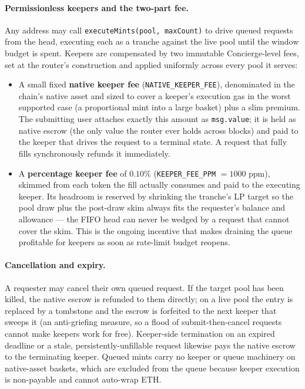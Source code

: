 \documentclass[11pt]{article}
\begin{document}
\paragraph{Permissionless keepers and the two-part fee.} Any address may
call \texttt{executeMints(pool, maxCount)} to drive queued requests from
the head, executing each as a tranche against the live pool until the
window budget is spent. Keepers are compensated by two immutable
Concierge-level fees, set at the router's construction and applied
uniformly across every pool it serves:
\begin{itemize}
  \item A small fixed \textbf{native keeper fee}
        (\texttt{NATIVE\_KEEPER\_FEE}), denominated in the chain's native
        asset and sized to cover a keeper's execution gas in the
        worst supported case (a proportional mint into a large basket)
        plus a slim premium. The submitting user attaches exactly this
        amount as \texttt{msg.value}; it is held as native escrow (the
        only value the router ever holds across blocks) and paid to the
        keeper that drives the request to a terminal state. A request
        that fully fills synchronously refunds it immediately.
  \item A \textbf{percentage keeper fee} of \textbf{$0.10\%$}
        (\texttt{KEEPER\_FEE\_PPM} $= 1000$ ppm), skimmed from each token
        the fill actually consumes and paid to the executing keeper. Its
        headroom is reserved by shrinking the tranche's LP target so the
        pool draw plus the post-draw skim always fits the requester's
        balance and allowance --- the FIFO head can never be wedged by a
        request that cannot cover the skim. This is the ongoing incentive
        that makes draining the queue profitable for keepers as soon as
        rate-limit budget reopens.
\end{itemize}

\paragraph{Cancellation and expiry.} A requester may cancel their own
queued request. If the target pool has been killed, the native escrow
is refunded to them directly; on a live pool the entry is replaced by a
tombstone and the escrow is forfeited to the next keeper that sweeps it
(an anti-griefing measure, so a flood of submit-then-cancel requests
cannot make keepers work for free). Keeper-side termination on an
expired deadline or a stale, persistently-unfillable request likewise
pays the native escrow to the terminating keeper. Queued mints carry no
keeper or queue machinery on native-asset baskets, which are excluded
from the queue because keeper execution is non-payable and cannot
auto-wrap ETH.
\end{document}
